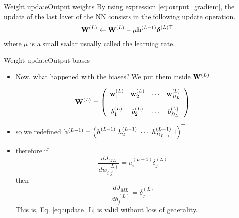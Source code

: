 \documentclass{beamer}
\begin{document}
\begin{frame}{Weight update}{Output weights}
By using  expression \eqref{eq:output_gradient}, the update of the last layer of the NN consists in the following update operation, 
\begin{equation}\label{eq:update_L}
    {\bf W}^{(L)} \leftarrow     {\bf W}^{(L)}  - \mu   {{\bf h}^{(L-1)}}{\boldsymbol \delta}^{(L)\top} 
\end{equation}
where $\mu$ is a small scalar usually called the learning rate.
\end{frame}

\begin{frame}{Weight update}{Output biases}
\begin{itemize}
    \item Now, what happened with the biases? We put them inside ${\bf W}^{(L)}$
    

 \begin{equation}
    {\bf W}^{(L)} = \left( 
        \begin{array}{cccc}
        {\bf w}^{(L)}_1 & {\bf w}^{(L)}_2 & \cdots &{\bf w}^{(L)}_{D_L} \\
        \\
        b^{(L)}_1 & b^{(L)}_2 & \cdots & b^{(L)}_{D_L}
    \end{array}
    \right)
\end{equation}
   
\item so we redefined ${\bf h}^{(L-1)} = \left( h^{(L-1)}_1~h^{(L-1)}_2~\cdots ~h^{(L-1)}_{D_{L-1} }~1\right)^\top$

\item therefore if   
\begin{equation}\nonumber
\frac{dJ_{ML}}{dw_{i,j}^{(L)}}= h_i^{(L-1)}\delta^{(L)}_j 
\end{equation}
then
\begin{equation}\label{eq:derivative_bias_L}
\frac{dJ_{ML}}{db_{j}^{(L)}}= \delta^{(L)}_j 
\end{equation}  
This is, Eq. \eqref{eq:update_L} is valid without loss of generality.
\end{itemize}
\end{frame}
\end{document}
